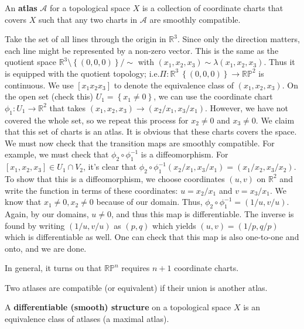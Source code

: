 \documentclass{../mathnotes}
\begin{document}
\begin{defn}
    An \textbf{atlas} $\mathcal{A}$ for a topological space $X$ is a collection of coordinate charts that covers $X$ such that any two charts in $\mathcal{A}$
    are smoothly compatible.
\end{defn}

\begin{exmp}
    Take the set of all lines through the origin in $\mathbb{R}^3$. Since only the direction matters, each line might be represented by a non-zero vector.
    This is the same as the quotient space $\mathbb{R}^3\setminus \left\{ (0,0,0) \right\}/\sim$ with $(x_1,x_2,x_3)\sim\lambda (x_1,x_2,x_3)$. Thus it is equipped
    with the quotient topology; i.e.$\Pi: \mathbb{R}^3\ \left\{ (0,0,0) \right\}\to \mathbb{R}\mathbb{P}^2$ is continuous. We use $\left[ x_1 x_2 x_3 \right]$ to
    denote the equivalence class of $\left( x_1, x_2, x_3 \right)$. On the open set (check this) $U_1=\left\{ x_1\neq 0 \right\}$, we can use the coordinate chart
    $\phi_1:U_1\to\mathbb{R}^2$ that takes $(x_1,x_2,x_3)\to\left( x_2/x_1, x_3/x_1 \right)$. However, we have not covered the whole set, so we repeat this process
    for $x_2\neq0$ and $x_3\neq 0$. We claim that this set of charts is an atlas. It is obvious that these charts covers the space. We must now check that the
    transition maps are smoothly compatible. For example, we must check that $\phi_2\circ\phi_1^{-1}$ is a diffeomorphism. For $\left[ x_1,x_2,x_3 \right]\in U_1\cap V_2$,
    it's clear that $\phi_2\circ\phi_1^{-1}(x_2/x_1,x_3/x_1)=(x_1/x_2,x_3/x_2)$. To show that this is a diffeomorphism, we choose coordinates $(u,v)$ on $\mathbb{R}^2$
    and write the function in terms of these coordinates: $u=x_2/x_1$ and $v=x_3/x_1$. We know that $x_1\neq 0,x_2\neq 0$ because of our domain. Thus,
    $\phi_2\circ\phi_1^{-1}=(1/u,v/u)$. Again, by our domains, $u\neq 0$, and thus this map is differentiable. The inverse is found by writing $(1/u,v/u)$ as $(p, q)$
    which yields $(u,v)=(1/p,q/p)$ which is differentiable as well. One can check that this map is also one-to-one and onto, and we are done.
\end{exmp}

In general, it turns ou that $\mathbb{RP}^n$ requires $n+1$ coordinate charts.

\begin{defn}
    Two atlases are compatible (or equivalent) if their union is another atlas.
\end{defn}

\begin{defn}
    A \textbf{differentiable (smooth) structure} on a topological space $X$ is an equivalence class of atlases (a maximal atlas).
\end{defn}
\end{document}
